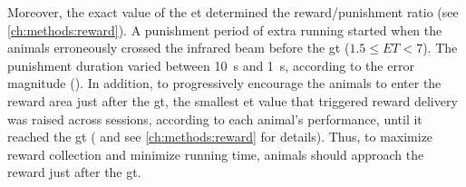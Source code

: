 Moreover, the exact value of the \gls{et} determined the reward/punishment ratio (see \autoref{ch:methods:reward}).
A punishment period of extra running started when the animals erroneously crossed the infrared beam before the \gls{gt} ($1.5\leq ET<7$).
The punishment duration varied between 10~s and 1~s, according to the error magnitude ().
In addition, to progressively encourage the animals to enter the reward area just after the \gls{gt}, the smallest \gls{et} value that triggered reward delivery was raised across sessions, according to each animal's performance, until it reached the \gls{gt} ( and see \autoref{ch:methods:reward} for details).
Thus, to maximize reward collection and minimize running time, animals should approach the reward just after the \gls{gt}.


